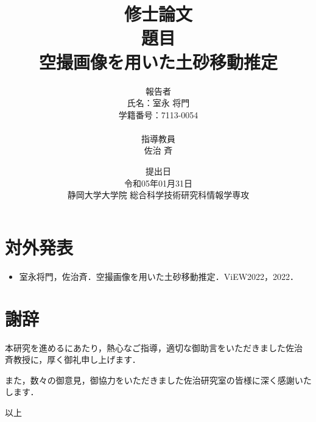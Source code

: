 


  \title{
    修士論文 \\
    \vspace{30pt}
    題目 \\
    空撮画像を用いた土砂移動推定 \\
    \vspace{60pt}
  }
  \author{
    報告者 \\
    氏名：室永 将門 \\
    学籍番号：7113-0054 \\
    \\
    指導教員 \\
    佐治 斉
    \vspace{30pt}
  }
  \date{
    提出日 \\
    令和05年01月31日 \\
    静岡大学大学院 総合科学技術研究科情報学専攻 \\
  }
  \maketitle

  \setcounter{tocdepth}{3}
  \tableofcontents

  
  
  
  

  \chapter*{対外発表}

    \begin{itemize}
      \item 室永将門，佐治斉．空撮画像を用いた土砂移動推定．ViEW2022，2022．
    \end{itemize}

  \clearpage

  \renewcommand{\bibname}{参考文献}
    
    

  \chapter*{謝辞}
      本研究を進めるにあたり，熱心なご指導，適切な御助言をいただきました佐治 斉教授に，厚く御礼申し上げます．

      また，数々の御意見，御協力をいただきました佐治研究室の皆様に深く感謝いたします．

    \begin{flushright}
      以上
    \end{flushright}


